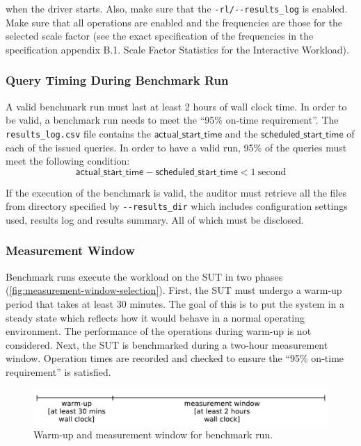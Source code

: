 \begin{description}
    when the driver starts. Also, make sure that the \verb|-rl/--results_log| is enabled. Make sure that all operations are enabled and the frequencies are those for the selected scale factor (see the exact specification of the frequencies in the specification appendix B.1. Scale Factor Statistics for the Interactive Workload).
\end{description}

\subsubsection{Query Timing During Benchmark Run}
\label{sec:ontime-requirements}
A valid benchmark run must last at least 2 hours of wall clock time.
In order to be valid, a benchmark run needs to meet the ``95\% on-time requirement''.
The \texttt{results\_log.csv} file contains the $\mathsf{actual\_start\_time}$ and the $\mathsf{scheduled\_start\_time}$ of each of the issued queries. In order to have a valid run, 95\% of the queries must meet the following condition:
\begin{equation*}
\mathsf{actual\_start\_time} - \mathsf{scheduled\_start\_time} < 1\
\mathrm{second}
\end{equation*}

If the execution of the benchmark is valid, the auditor must retrieve all the files from directory specified by \verb|--results_dir| which includes configuration settings used, results log and results summary. All of which must be disclosed.

\subsubsection{Measurement Window}
\label{sec:int-measurement-window}

Benchmark runs execute the workload on the SUT in two phases (\autoref{fig:measurement-window-selection}).
First, the SUT must undergo a warm-up period that takes at least 30 minutes. The goal of this is to put the system in a steady state which reflects how it would behave in a normal operating environment. The performance of the operations during warm-up is not considered.
Next, the SUT is benchmarked during a two-hour measurement window. Operation times are recorded and checked to ensure the ``95\% on-time requirement'' is satisfied.

\begin{figure}[h]
    \centering
    \includegraphics[width=.7\linewidth]{figures/measurement-window-selection}
    \caption{Warm-up and measurement window for benchmark run.}
    \label{fig:measurement-window-selection}
\end{figure}

